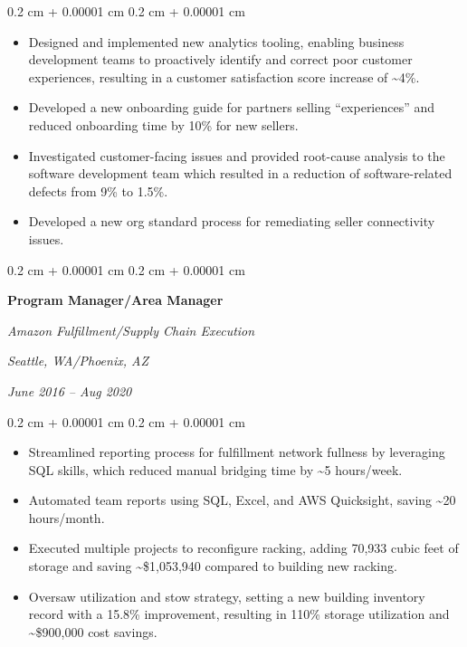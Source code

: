 \documentclass[10pt, letterpaper]{article}
\newenvironment{highlights}{
    \begin{itemize}[
        topsep=0.10 cm,
        parsep=0.10 cm,
        partopsep=0pt,
        itemsep=0pt,
        leftmargin=0.4 cm + 10pt
    ]
}{
    \end{itemize}
} %
\newenvironment{onecolentry}{
    \begin{adjustwidth}{
        0.2 cm + 0.00001 cm
    }{
        0.2 cm + 0.00001 cm
    }
}{
    \end{adjustwidth}
} %
\newenvironment{twocolentry}[2][]{
    \onecolentry
    \def\secondColumn{#2}
    \setcolumnwidth{\fill, 4.5 cm}
    \begin{paracol}{2}
}{
    \switchcolumn \raggedleft \secondColumn
    \end{paracol}
    \endonecolentry
} %
\begin{document}
        \vspace{0.10 cm}
        \begin{onecolentry}
            \begin{highlights}
                \item Designed and implemented new analytics tooling, enabling business development teams to proactively identify and correct poor customer experiences, resulting in a customer satisfaction score increase of \textasciitilde{}4\%.
                \item Developed a new onboarding guide for partners selling “experiences” and reduced onboarding time by 10\% for new sellers.
                \item Investigated customer-facing issues and provided root-cause analysis to the software development team which resulted in a reduction of software-related defects from 9\% to 1.5\%.
                \item Developed a new org standard process for remediating seller connectivity issues.
            \end{highlights}
        \end{onecolentry}


        \vspace{0.2 cm}

        \begin{twocolentry}{
        \textit{Seattle, WA/Phoenix, AZ}    
            
        \textit{June 2016 – Aug 2020}}
            \textbf{Program Manager/Area Manager}
            
            \textit{Amazon Fulfillment/Supply Chain Execution}
        \end{twocolentry}

        \vspace{0.10 cm}
        \begin{onecolentry}
            \begin{highlights}
                \item Streamlined reporting process for fulfillment network fullness by leveraging SQL skills, which reduced manual bridging time by \textasciitilde{}5 hours/week.
                \item Automated team reports using SQL, Excel, and AWS Quicksight, saving \textasciitilde{}20 hours/month.
                \item Executed multiple projects to reconfigure racking, adding 70,933 cubic feet of storage and saving \textasciitilde{}\$1,053,940 compared to building new racking.
                \item Oversaw utilization and stow strategy, setting a new building inventory record with a 15.8\% improvement, resulting in 110\% storage utilization and \textasciitilde{}\$900,000 cost savings.
            \end{highlights}
        \end{onecolentry}
\end{document}
